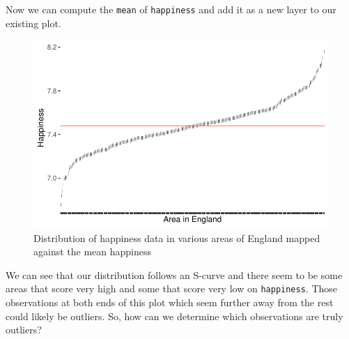 \documentclass[
  letterpaper,
]{krantz}
\makeatletter
\newenvironment{Shaded}{\begin{snugshade}}{\end{snugshade}}
\newcommand{\AttributeTok}[1]{\textcolor[rgb]{0.40,0.45,0.13}{#1}}
\newcommand{\CommentTok}[1]{\textcolor[rgb]{0.37,0.37,0.37}{#1}}
\newcommand{\ConstantTok}[1]{\textcolor[rgb]{0.56,0.35,0.01}{#1}}
\newcommand{\FunctionTok}[1]{\textcolor[rgb]{0.28,0.35,0.67}{#1}}
\newcommand{\NormalTok}[1]{\textcolor[rgb]{0.00,0.23,0.31}{#1}}
\newcommand{\OtherTok}[1]{\textcolor[rgb]{0.00,0.23,0.31}{#1}}
\newcommand{\SpecialCharTok}[1]{\textcolor[rgb]{0.37,0.37,0.37}{#1}}
\newcommand{\StringTok}[1]{\textcolor[rgb]{0.13,0.47,0.30}{#1}}
\newenvironment{kframe}{%
\medskip{}
\setlength{\fboxsep}{.8em}
 \def\at@end@of@kframe{}%
 \ifinner\ifhmode%
  \def\at@end@of@kframe{\end{minipage}}%
  \begin{minipage}{\columnwidth}%
 \fi\fi%
 \def\FrameCommand##1{\hskip\@totalleftmargin \hskip-\fboxsep
 \colorbox{shadecolor}{##1}\hskip-\fboxsep
     \hskip-\linewidth \hskip-\@totalleftmargin \hskip\columnwidth}%
 \MakeFramed {\advance\hsize-\width
   \@totalleftmargin\z@ \linewidth\hsize
   \@setminipage}}%
 {\par\unskip\endMakeFramed%
 \at@end@of@kframe}
\renewenvironment{Shaded}{\begin{kframe}}{\end{kframe}}
\makeatother
\begin{document}
Now we can compute the \texttt{mean} of \texttt{happiness} and add it as
a new layer to our existing plot.

\begin{Shaded}
\end{Shaded}

\begin{figure}[H]

{\centering \includegraphics{09_sources_of_bias_files/figure-latex/deviation-plot-with-mean-happiness-1.pdf}

}

\caption{Distribution of happiness data in various areas of England
mapped against the mean happiness}

\end{figure}%

We can see that our distribution follows an S-curve and there seem to be
some areas that score very high and some that score very low on
\texttt{happiness}. Those observations at both ends of this plot which
seem further away from the rest could likely be outliers. So, how can we
determine which observations are truly outliers?
\end{document}
